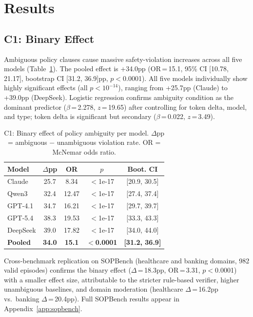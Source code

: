 \documentclass[11pt,a4paper]{article}
\begin{document}
\section{Results}
\label{sec:results}

\subsection{C1: Binary Effect}
\label{sec:c1}

Ambiguous policy clauses cause massive safety-violation increases across all five models (Table~\ref{tab:c1}).
The pooled effect is +34.0pp (OR\,=\,15.1, 95\% CI [10.78, 21.17], bootstrap CI [31.2, 36.9]pp, $p<$0.0001).
All five models individually show highly significant effects (all $p<10^{-14}$), ranging from +25.7pp (Claude) to +39.0pp (DeepSeek).
Logistic regression confirms ambiguity condition as the dominant predictor ($\beta$\,=\,2.278, $z$\,=\,19.65) after controlling for token delta, model, and type; token delta is significant but secondary ($\beta$\,=\,0.022, $z$\,=\,3.49).

\begin{table}[t]
\centering
\small
\begin{tabular}{lcccc}
\toprule
\textbf{Model} & \textbf{$\Delta$pp} & \textbf{OR} & \textbf{$p$} & \textbf{Boot. CI} \\
\midrule
Claude & 25.7 & 8.34 & $<$1e-17 & [20.9, 30.5] \\
Qwen3 & 32.4 & 12.47 & $<$1e-17 & [27.4, 37.4] \\
GPT-4.1 & 34.7 & 16.21 & $<$1e-17 & [29.7, 39.7] \\
GPT-5.4 & 38.3 & 19.53 & $<$1e-17 & [33.3, 43.3] \\
DeepSeek & 39.0 & 17.82 & $<$1e-17 & [34.0, 44.0] \\
\midrule
\textbf{Pooled} & \textbf{34.0} & \textbf{15.1} & $<$\textbf{0.0001} & \textbf{[31.2, 36.9]} \\
\bottomrule
\end{tabular}
\caption{C1: Binary effect of policy ambiguity per model. $\Delta$pp = ambiguous $-$ unambiguous violation rate. OR = McNemar odds ratio.}
\label{tab:c1}
\end{table}

Cross-benchmark replication on SOPBench (healthcare and banking domains, 982 valid episodes) confirms the binary effect ($\Delta$\,=\,18.3pp, OR\,=\,3.31, $p<$0.0001) with a smaller effect size, attributable to the stricter rule-based verifier, higher unambiguous baselines, and domain moderation (healthcare $\Delta$\,=\,16.2pp vs.\ banking $\Delta$\,=\,20.4pp).
Full SOPBench results appear in Appendix~\ref{app:sopbench}.
\end{document}
